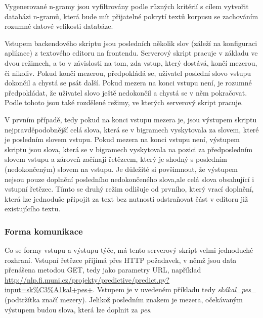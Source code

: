 \documentclass[a4paper,11pt]{article}
\begin{document}

Vygenerované n-gramy jsou vyfiltrovány podle různých kritérií s cílem vytvořit databázi n-gramů, která bude mít přijatelné pokrytí textů korpusu se zachováním rozumné datové velikosti databáze. \parencite[13]{neverilovaulipova2014}



Vstupem backendového skriptu jsou posledních několik slov (záleží na konfiguraci aplikace) z textového editoru na frontendu. Serverový skript pracuje v základu ve dvou režimech, a to v závislosti na tom, zda vstup, který dostává, končí mezerou, či nikoliv. Pokud končí mezerou, předpokládá se, uživatel poslední slovo vstupu dokončil a chystá se psát další. Pokud mezera na konci vstupu není, je rozumné předpokládat, že uživatel slovo ještě nedokončil a chystá se v něm pokračovat. Podle tohoto jsou také rozdělené režimy, ve kterých serverový skript pracuje. 

V prvním případě, tedy pokud na konci vstupu mezera je, jsou výstupem skriptu nejpravděpodobnější celá slova, která se v bigramech vyskytovala za slovem, které je posledním slovem vstupu. Pokud mezera na konci vstupu není, výstupem skriptu jsou slova, která se v bigramech vyskytovala na pozici za předposledním slovem vstupu a zároveň začínají řetězcem, který je shodný s posledním (nedokončeným) slovem na vstupu. Je důležité si povšimnout, že výstupem nejsou pouze doplnění posledního nedokončeného slova,ale celá slova obsahující i vstupní řetězec. Tímto se druhý režim odlišuje od prvního, který vrací doplnění, která lze jednoduše připojit za text bez nutnosti odstraňovat část v editoru již existujícího textu.

\subsubsection{Forma komunikace}

Co se formy vstupu a výstupu týče, má tento serverový skript velmi jednoduché rozhraní. Vstupní řetězce přijímá přes HTTP požadavek, v němž jsou data přenášena metodou GET, tedy jako parametry URL, například \url{http://nlp.fi.muni.cz/projekty/predictive/predict.py?input=sk%C3%A1kal+pes+}. Vstupem je v uvedeném příkladu tedy {\it skákal\_pes\_} (podtržítka značí mezery). Jelikož posledním znakem je mezera, očekávaným výstupem budou slova, která lze doplnit za {\it pes}. 
\end{document}
